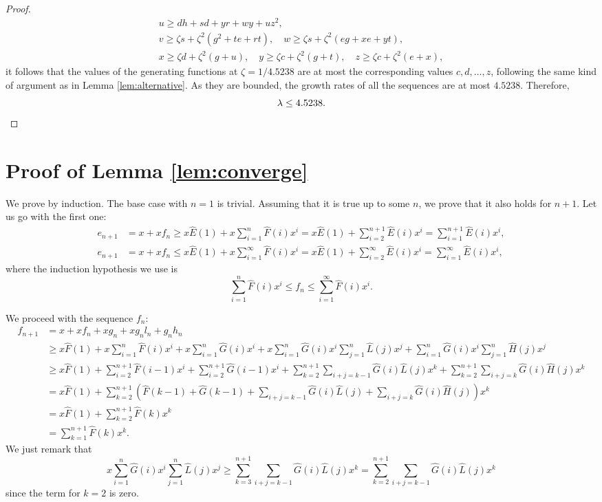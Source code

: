 \documentclass[a4paper,12pt]{article}
\begin{document}
\begin{proof}
\begin{gather*}
		u \ge d h + s d + y r + w y + u z^{2},\\
		v \ge \zeta s + \zeta^{2}(g^{2} + t e + r t),\quad 
		w \ge \zeta s + \zeta^{2}(e g + x e + y t),\\
		x \ge \zeta d + \zeta^{2}(g + u),\quad 
		y \ge \zeta c + \zeta^{2}(g + t),\quad 
		z \ge \zeta c + \zeta^{2}(e + x),
	\end{gather*}
	it follows that the values of the generating functions at $\zeta=1/4.5238$ are at most the corresponding values $c,d,\dots,z$, following the same kind of argument as in Lemma \ref{lem:alternative}. As they are bounded, the growth rates of all the sequences are at most $4.5238$. Therefore,
	\[
		\lambda\le 4.5238.\qedhere
	\]
\end{proof}

\appendix
\section{Proof of Lemma \ref{lem:converge}}
\label{sec:converge}
	We prove by induction. The base case with $n=1$ is trivial. Assuming that it is true up to some $n$, we prove that it also holds for $n+1$. Let us go with the first one:
	\begin{align*}
		e_{n+1} &= x + x f_n \ge x\hat{E}(1) + x\sum_{i=1}^n \hat{F}(i) x^i
		= x\hat{E}(1) + \sum_{i=2}^{n+1} \hat{E}(i) x^i = \sum_{i=1}^{n+1} \hat{E}(i) x^{i},\\
		e_{n+1} &= x + x f_n \le x\hat{E}(1) + x\sum_{i=1}^\infty \hat{F}(i) x^i
		= x\hat{E}(1) + \sum_{i=2}^\infty \hat{E}(i) x^i = \sum_{i=1}^\infty \hat{E}(i) x^{i},
	\end{align*}
	where the induction hypothesis we use is
	\[
		\sum_{i=1}^n \hat{F}(i) x^i \le f_n \le \sum_{i=1}^\infty \hat{F}(i) x^i.
	\]

    We proceed with the sequence $f_n$:
    {\small
	\begin{align*}
		f_{n+1} &= x + x f_n + x g_n + x g_n l_n + g_n h_n \\
		&\ge x\hat{F}(1) + x\sum_{i=1}^n \hat{F}(i) x^i + x\sum_{i=1}^n \hat{G}(i) x^i + x\sum_{i=1}^n \hat{G}(i) x^i \sum_{j=1}^n \hat{L}(j) x^j  + \sum_{i=1}^n \hat{G}(i) x^i \sum_{j=1}^n \hat{H}(j) x^j \\
		&\ge x\hat{F}(1) + \sum_{i=2}^{n+1} \hat{F}(i-1) x^i + \sum_{i=2}^{n+1} \hat{G}(i-1) x^i + \sum_{k=2}^{n+1} \sum_{i+j=k-1} \hat{G}(i) \hat{L}(j) x^k + \sum_{k=2}^{n+1} \sum_{i+j=k} \hat{G}(i) \hat{H}(j) x^k \\
        &= x\hat{F}(1) + \sum_{k=2}^{n+1} \left(\hat{F}(k-1) +  \hat{G}(k-1) + \sum_{i+j=k-1} \hat{G}(i) \hat{L}(j) + \sum_{i+j=k} \hat{G}(i) \hat{H}(j)\right) x^k \\
        &= x\hat{F}(1) + \sum_{k=2}^{n+1} \hat{F}(k) x^k \\
		&= \sum_{k=1}^{n+1} \hat{F}(k) x^k.
	\end{align*}
    }
    We just remark that
    \[
        x\sum_{i=1}^n \hat{G}(i) x^i \sum_{j=1}^n \hat{L}(j) x^j\ge \sum_{k=3}^{n+1} \sum_{i+j=k-1} \hat{G}(i) \hat{L}(j) x^k = \sum_{k=2}^{n+1} \sum_{i+j=k-1} \hat{G}(i) \hat{L}(j) x^k
    \]
    since the term for $k=2$ is zero.
\end{document}
